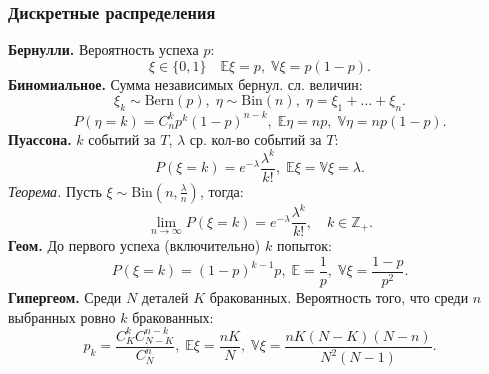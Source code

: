 \subsubsection{Дискретные распределения}
\textbf{Бернулли.} Вероятность успеха $p$:
$$\xi\in\{0,1\}\quad \mathbb{E}\xi=p,\;\mathbb{V}\xi=p(1-p).$$
\textbf{Биномиальное.} Сумма независимых бернул. сл. величин:
$$\xi_k\sim\text{Bern}(p),\;\eta\sim\text{Bin}(n),\;\eta=\xi_1+\dots+\xi_n.$$
$$P(\eta=k)=C_n^kp^k(1-p)^{n-k},\;\mathbb{E}\eta=np,\;\mathbb{V}\eta=np(1-p).$$
\textbf{Пуассона.} $k$ событий за $T$, $\lambda$ ср. кол-во событий за $T$:
$$P(\xi=k)=e^{-\lambda}\dfrac{\lambda^k}{k!},\;\mathbb{E}\xi=\mathbb{V}\xi=\lambda.$$
\textit{Теорема.} Пусть $\xi\sim\text{Bin}(n,\frac{\lambda}{n})$, тогда:
$$\displaystyle\lim_{n\to\infty}P(\xi=k)=e^{-\lambda}\dfrac{\lambda^k}{k!},\quad k\in\mathbb{Z}_+.$$
\textbf{Геом.} До первого успеха (включительно) $k$ попыток:
$$P(\xi=k)=(1-p)^{k-1}p,\;\mathbb{E}=\dfrac{1}{p},\;\mathbb{V}\xi=\dfrac{1-p}{p^2}.$$
\textbf{Гипергеом.} Среди $N$ деталей $K$ бракованных. Вероятность того, что среди $n$ выбранных ровно $k$ бракованных:
$$p_k=\dfrac{C_K^kC_{N-K}^{n-k}}{C_N^n},\;\mathbb{E}\xi=\dfrac{nK}{N},\;\mathbb{V}\xi=\dfrac{nK(N-K)(N-n)}{N^2(N-1)}.$$